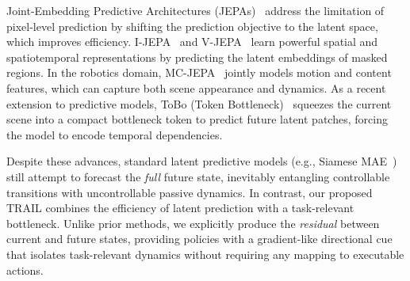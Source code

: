 Joint-Embedding Predictive Architectures (JEPAs)~\cite{lecun2022path} address the limitation of pixel-level prediction by shifting the prediction objective to the latent space, which improves efficiency. I-JEPA~\cite{assran2023self} and V-JEPA~\cite{bardes2024revisiting} learn powerful spatial and spatiotemporal representations by predicting the latent embeddings of masked regions. In the robotics domain, MC-JEPA~\cite{benchetrit2024mcjepa} jointly models motion and content features, which can capture both scene appearance and dynamics. As a recent extension to predictive models, ToBo (Token Bottleneck)~\cite{kim2025token} squeezes the current scene into a compact bottleneck token to predict future latent patches, forcing the model to encode temporal dependencies. 

Despite these advances, standard latent predictive models (e.g., Siamese MAE~\cite{gupta2023siamese}) still attempt to forecast the \textit{full} future state, inevitably entangling controllable transitions with uncontrollable passive dynamics. In contrast, our proposed TRAIL combines the efficiency of latent prediction with a task-relevant bottleneck. Unlike prior methods, we explicitly produce the \textit{residual} between current and future states, providing policies with a gradient-like directional cue that isolates task-relevant dynamics without requiring any mapping to executable actions.
